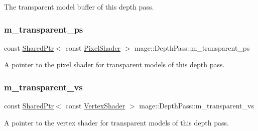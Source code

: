 The transparent model buffer of this depth pass. \hypertarget{classmage_1_1_depth_pass_a5b6a53892db2e9d9fd1a21c3b8cf6d19}{}\label{classmage_1_1_depth_pass_a5b6a53892db2e9d9fd1a21c3b8cf6d19} 
\subsubsection{\texorpdfstring{m\+\_\+transparent\+\_\+ps}{m\_transparent\_ps}}
{\footnotesize\ttfamily const \hyperlink{namespacemage_a1e01ae66713838a7a67d30e44c67703e}{Shared\+Ptr}$<$ const \hyperlink{namespacemage_a27ecaf266420ee7a494d64edc0757129}{Pixel\+Shader} $>$ mage\+::\+Depth\+Pass\+::m\+\_\+transparent\+\_\+ps\hspace{0.3cm}{\ttfamily [private]}}

A pointer to the pixel shader for transparent models of this depth pass. \hypertarget{classmage_1_1_depth_pass_a0227142e9867e0599c770bdbe0c2241c}{}\label{classmage_1_1_depth_pass_a0227142e9867e0599c770bdbe0c2241c} 
\subsubsection{\texorpdfstring{m\+\_\+transparent\+\_\+vs}{m\_transparent\_vs}}
{\footnotesize\ttfamily const \hyperlink{namespacemage_a1e01ae66713838a7a67d30e44c67703e}{Shared\+Ptr}$<$ const \hyperlink{classmage_1_1_vertex_shader}{Vertex\+Shader} $>$ mage\+::\+Depth\+Pass\+::m\+\_\+transparent\+\_\+vs\hspace{0.3cm}{\ttfamily [private]}}

A pointer to the vertex shader for transparent models of this depth pass. 